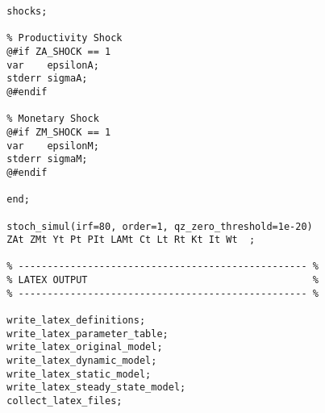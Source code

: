 \documentclass[
thesis.tex
]{subfiles}
\begin{document}
{\begin{verbatim}
		shocks; 
		
		% Productivity Shock
		@#if ZA_SHOCK == 1
		var    epsilonA;
		stderr sigmaA;
		@#endif
		
		% Monetary Shock
		@#if ZM_SHOCK == 1
		var    epsilonM;
		stderr sigmaM;
		@#endif
		
		end;
		
		stoch_simul(irf=80, order=1, qz_zero_threshold=1e-20) 
		ZAt ZMt Yt Pt PIt LAMt Ct Lt Rt Kt It Wt  ;
		
		% -------------------------------------------------- % 
		% LATEX OUTPUT                                       %
		% -------------------------------------------------- % 
		
		write_latex_definitions;
		write_latex_parameter_table;
		write_latex_original_model;
		write_latex_dynamic_model;
		write_latex_static_model;
		write_latex_steady_state_model;
		collect_latex_files;
		
	\end{verbatim}
	
} %
\end{document}
